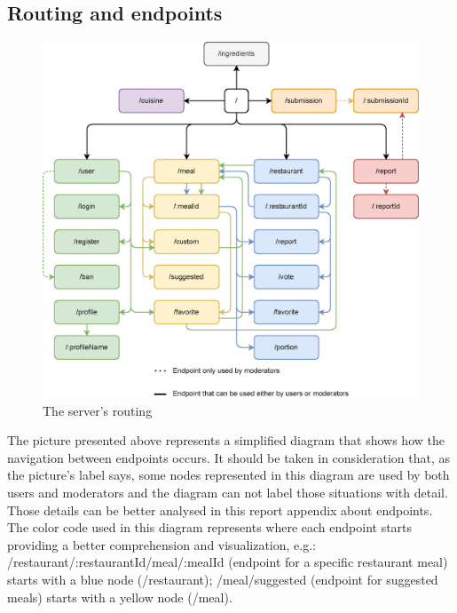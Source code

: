 \subsection{Routing and endpoints}

\begin{figure}[H]
    \begin{center}
        \includegraphics[scale=0.8]{_figures/endpoints_diagram.eps}
        \caption{The server's routing}
    \end{center}
\end{figure}

The picture presented above represents a simplified diagram that shows how the navigation between endpoints occurs.
It should be taken in consideration that, as the picture's label says, some nodes represented in this diagram are used by 
both users and moderators and the diagram can not label those situations with detail. Those details can be better analysed
in this report appendix about endpoints.\\

The color code used in this diagram represents where each endpoint starts providing a better comprehension
and visualization, e.g.: /restaurant/:restaurantId/meal/:mealId (endpoint for a specific restaurant meal) starts with a blue
node (/restaurant); /meal/suggested (endpoint for suggested meals) starts with a yellow node (/meal).\\

